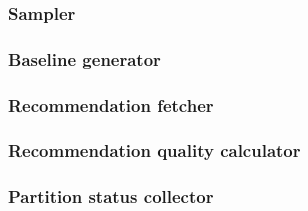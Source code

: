 

\subsubsection{Sampler}
\label{subsubsec:sampler}


\subsubsection{Baseline generator}
\label{subsubsec:baseline-generator}

\subsubsection{Recommendation fetcher}
\label{subsubsec:recommendation-fetcher}

\subsubsection{Recommendation quality calculator}
\label{subsubsec:recommendation-quality-calculator}


\subsubsection{Partition status collector}
\label{subsubsec:partition-status-collector}
